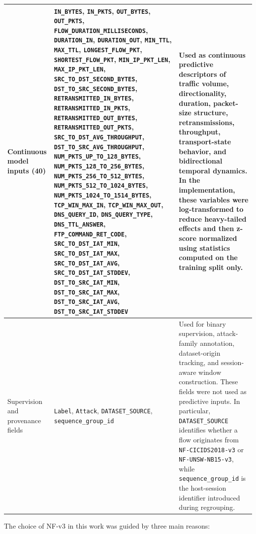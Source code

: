 \documentclass[12pt, a4paper]{report}
\begin{document}
\begin{table}[H]
\begin{tabularx}{\linewidth}{|p{3.1cm}|p{7.4cm}|X|}
Continuous model inputs (40)
&
\texttt{IN\_BYTES}, \texttt{IN\_PKTS}, \texttt{OUT\_BYTES}, \texttt{OUT\_PKTS}, \texttt{FLOW\_DURATION\_MILLISECONDS}, \texttt{DURATION\_IN}, \texttt{DURATION\_OUT}, \texttt{MIN\_TTL}, \texttt{MAX\_TTL}, \texttt{LONGEST\_FLOW\_PKT}, \texttt{SHORTEST\_FLOW\_PKT}, \texttt{MIN\_IP\_PKT\_LEN}, \texttt{MAX\_IP\_PKT\_LEN}, \texttt{SRC\_TO\_DST\_SECOND\_BYTES}, \texttt{DST\_TO\_SRC\_SECOND\_BYTES}, \texttt{RETRANSMITTED\_IN\_BYTES}, \texttt{RETRANSMITTED\_IN\_PKTS}, \texttt{RETRANSMITTED\_OUT\_BYTES}, \texttt{RETRANSMITTED\_OUT\_PKTS}, \texttt{SRC\_TO\_DST\_AVG\_THROUGHPUT}, \texttt{DST\_TO\_SRC\_AVG\_THROUGHPUT}, \texttt{NUM\_PKTS\_UP\_TO\_128\_BYTES}, \texttt{NUM\_PKTS\_128\_TO\_256\_BYTES}, \texttt{NUM\_PKTS\_256\_TO\_512\_BYTES}, \texttt{NUM\_PKTS\_512\_TO\_1024\_BYTES}, \texttt{NUM\_PKTS\_1024\_TO\_1514\_BYTES}, \texttt{TCP\_WIN\_MAX\_IN}, \texttt{TCP\_WIN\_MAX\_OUT}, \texttt{DNS\_QUERY\_ID}, \texttt{DNS\_QUERY\_TYPE}, \texttt{DNS\_TTL\_ANSWER}, \texttt{FTP\_COMMAND\_RET\_CODE}, \texttt{SRC\_TO\_DST\_IAT\_MIN}, \texttt{SRC\_TO\_DST\_IAT\_MAX}, \texttt{SRC\_TO\_DST\_IAT\_AVG}, \texttt{SRC\_TO\_DST\_IAT\_STDDEV}, \texttt{DST\_TO\_SRC\_IAT\_MIN}, \texttt{DST\_TO\_SRC\_IAT\_MAX}, \texttt{DST\_TO\_SRC\_IAT\_AVG}, \texttt{DST\_TO\_SRC\_IAT\_STDDEV}
&
Used as continuous predictive descriptors of traffic volume, directionality, duration, packet-size structure, retransmissions, throughput, transport-state behavior, and bidirectional temporal dynamics. In the implementation, these variables were log-transformed to reduce heavy-tailed effects and then z-score normalized using statistics computed on the training split only.
\\ \hline

Supervision and provenance fields
&
\texttt{Label}, \texttt{Attack}, \texttt{DATASET\_SOURCE}, \texttt{sequence\_group\_id}
&
Used for binary supervision, attack-family annotation, dataset-origin tracking, and session-aware window construction. These fields were not used as predictive inputs. In particular, \texttt{DATASET\_SOURCE} identifies whether a flow originates from \texttt{NF-CICIDS2018-v3} or \texttt{NF-UNSW-NB15-v3}, while \texttt{sequence\_group\_id} is the host-session identifier introduced during regrouping.
\\ \hline
\end{tabularx}
\end{table}

\newpage
The choice of NF-v3 in this work was guided by three main reasons:
\end{document}
